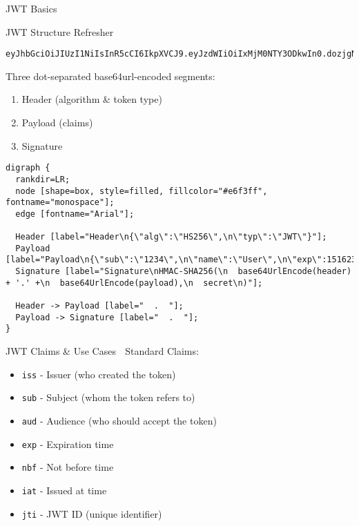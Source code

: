 \documentclass[presentation,aspectratio=169]{beamer}
\begin{document}
\begin{frame}[label={sec:orga2169dd},fragile]{JWT Basics}
 \begin{block}{JWT Structure Refresher 🔰}
\begin{verbatim}
eyJhbGciOiJIUzI1NiIsInR5cCI6IkpXVCJ9.eyJzdWIiOiIxMjM0NTY3ODkwIn0.dozjgNryP4J3jVmNHl0w5N_XgL0n3I9PlFUP0THsR8U
\end{verbatim}

Three dot-separated base64url-encoded segments:
\begin{enumerate}
\item \alert{Header} (algorithm \& token type)
\item \alert{Payload} (claims)
\item \alert{Signature}
\end{enumerate}

\begin{verbatim}
digraph {
  rankdir=LR;
  node [shape=box, style=filled, fillcolor="#e6f3ff", fontname="monospace"];
  edge [fontname="Arial"];

  Header [label="Header\n{\"alg\":\"HS256\",\n\"typ\":\"JWT\"}"];
  Payload [label="Payload\n{\"sub\":\"1234\",\n\"name\":\"User\",\n\"exp\":1516239022}"];
  Signature [label="Signature\nHMAC-SHA256(\n  base64UrlEncode(header) + '.' +\n  base64UrlEncode(payload),\n  secret\n)"];

  Header -> Payload [label="  .  "];
  Payload -> Signature [label="  .  "];
}
\end{verbatim}
\end{block}
\begin{block}{JWT Claims \& Use Cases 🔰}
\alert{Standard Claims:}
\begin{itemize}
\item \texttt{iss} - Issuer (who created the token)
\item \texttt{sub} - Subject (whom the token refers to)
\item \texttt{aud} - Audience (who should accept the token)
\item \texttt{exp} - Expiration time
\item \texttt{nbf} - Not before time
\item \texttt{iat} - Issued at time
\item \texttt{jti} - JWT ID (unique identifier)
\end{itemize}


\end{block}
\end{frame}
\end{document}
